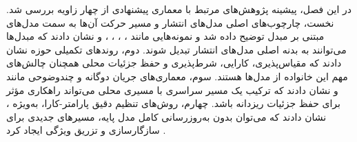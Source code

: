 در این فصل، پیشینه پژوهش‌های مرتبط با معماری پیشنهادی از چهار زاویه بررسی شد. نخست، چارچوب‌های اصلی مدل‌های انتشار و مسیر حرکت آن‌ها به سمت مدل‌های مبتنی بر مبدل توضیح داده شد و نمونه‌هایی مانند ، ، ، ،  و  نشان دادند که مبدل‌ها می‌توانند به بدنه اصلی مدل‌های انتشار تبدیل شوند. دوم، روندهای تکمیلی حوزه نشان دادند که مقیاس‌پذیری، کارایی، شرط‌پذیری و حفظ جزئیات محلی همچنان چالش‌های مهم این خانواده از مدل‌ها هستند. سوم، معماری‌های جریان دوگانه و چندوضوحی مانند  و  نشان دادند که ترکیب یک مسیر سراسری با مسیری محلی می‌تواند راهکاری مؤثر برای حفظ جزئیات ریزدانه باشد. چهارم، روش‌های تنظیم دقیق پارامتر-کارا، به‌ویژه ، نشان دادند که می‌توان بدون به‌روزرسانی کامل مدل پایه، مسیرهای جدیدی برای سازگارسازی و تزریق ویژگی ایجاد کرد \cite{0214306,2212.09748,wang2020hrnet,chen2021crossvit,8409325,Pan2024FineDiffusion}.

